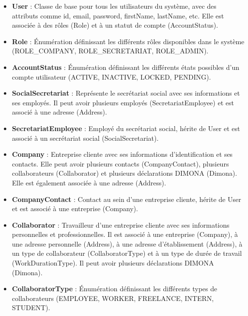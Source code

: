 \begin{itemize}[leftmargin=*,label=\textcolor{darkgray}{$\bullet$},itemsep=0.3em]
  \item \textbf{User} : Classe de base pour tous les utilisateurs du système, avec des attributs comme id, email, password, firstName, lastName, etc. Elle est associée à des rôles (Role) et à un statut de compte (AccountStatus).

  \item \textbf{Role} : Énumération définissant les différents rôles disponibles dans le système (ROLE\_COMPANY, ROLE\_SECRETARIAT, ROLE\_ADMIN).

  \item \textbf{AccountStatus} : Énumération définissant les différents états possibles d'un compte utilisateur (ACTIVE, INACTIVE, LOCKED, PENDING).

  \item \textbf{SocialSecretariat} : Représente le secrétariat social avec ses informations et ses employés. Il peut avoir plusieurs employés (SecretariatEmployee) et est associé à une adresse (Address).

  \item \textbf{SecretariatEmployee} : Employé du secrétariat social, hérite de User et est associé à un secrétariat social (SocialSecretariat).

  \item \textbf{Company} : Entreprise cliente avec ses informations d'identification et ses contacts. Elle peut avoir plusieurs contacts (CompanyContact), plusieurs collaborateurs (Collaborator) et plusieurs déclarations DIMONA (Dimona). Elle est également associée à une adresse (Address).

  \item \textbf{CompanyContact} : Contact au sein d'une entreprise cliente, hérite de User et est associé à une entreprise (Company).

  \item \textbf{Collaborator} : Travailleur d'une entreprise cliente avec ses informations personnelles et professionnelles. Il est associé à une entreprise (Company), à une adresse personnelle (Address), à une adresse d'établissement (Address), à un type de collaborateur (CollaboratorType) et à un type de durée de travail (WorkDurationType). Il peut avoir plusieurs déclarations DIMONA (Dimona).

  \item \textbf{CollaboratorType} : Énumération définissant les différents types de collaborateurs (EMPLOYEE, WORKER, FREELANCE, INTERN, STUDENT).


\end{itemize}
